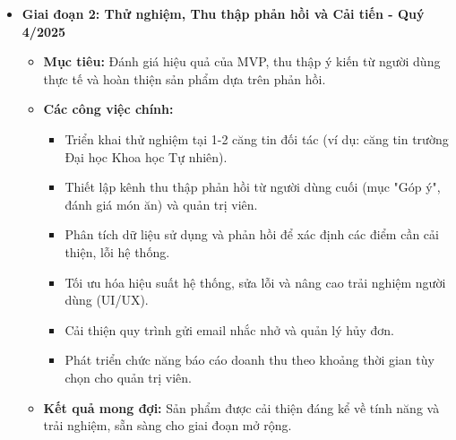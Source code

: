 \documentclass[12pt,a4paper]{article}
\begin{document}
\begin{itemize}[label=\textbullet]
    \item \textbf{Giai đoạn 2: Thử nghiệm, Thu thập phản hồi và Cải tiến - Quý 4/2025}
    \begin{itemize}[label=\textendash]
        \item \textbf{Mục tiêu:} Đánh giá hiệu quả của MVP, thu thập ý kiến từ người dùng thực tế và hoàn thiện sản phẩm dựa trên phản hồi.
        \item \textbf{Các công việc chính:}
        \begin{itemize}[label=\textrightarrow]
            \item Triển khai thử nghiệm tại 1-2 căng tin đối tác (ví dụ: căng tin trường Đại học Khoa học Tự nhiên).
            \item Thiết lập kênh thu thập phản hồi từ người dùng cuối (mục "Góp ý", đánh giá món ăn) và quản trị viên.
            \item Phân tích dữ liệu sử dụng và phản hồi để xác định các điểm cần cải thiện, lỗi hệ thống.
            \item Tối ưu hóa hiệu suất hệ thống, sửa lỗi và nâng cao trải nghiệm người dùng (UI/UX).
            \item Cải thiện quy trình gửi email nhắc nhở và quản lý hủy đơn.
            \item Phát triển chức năng báo cáo doanh thu theo khoảng thời gian tùy chọn cho quản trị viên.
        \end{itemize}
        \item \textbf{Kết quả mong đợi:} Sản phẩm được cải thiện đáng kể về tính năng và trải nghiệm, sẵn sàng cho giai đoạn mở rộng.
    \end{itemize}


\end{itemize}
\end{document}
